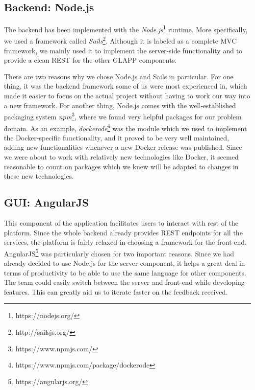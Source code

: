 \documentclass{seal_thesis}
\begin{document}
\subsection{Backend: Node.js}
The backend has been implemented with the \textit{Node.js}\footnote{https://nodejs.org/} runtime.
More specifically, we used a framework called \textit{Sails}\footnote{http://sailsjs.org/}.
Although it is labeled as a complete MVC framework, we mainly used it to implement the server-side functionality and to provide a clean REST for the other GLAPP components.

There are two reasons why we chose Node.js and Sails in particular.
For one thing, it was the backend framework some of us were most experienced in, which made it easier to focus on the actual project without having to work our way into a new framework.
For another thing, Node.js comes with the well-established packaging system \textit{npm}\footnote{https://www.npmjs.com/}, where we found very helpful packages for our problem domain.
As an example, \textit{dockerode}\footnote{https://www.npmjs.com/package/dockerode} was the module which we used to implement the Docker-specific functionality, and it proved to be very well maintained, adding new functionalities whenever a new Docker release was published.
Since we were about to work with relatively new technologies like Docker, it seemed reasonable to count on packages which we knew will be adapted to changes in these new technologies.

\subsection{GUI: AngularJS}


This component of the application facilitates users to interact with rest of the platform. 
Since the whole backend already provides REST endpoints for all the services, the platform is fairly relaxed in choosing a framework for the front-end. 
AngularJS\footnote{https://angularjs.org/} was particularly chosen for two important reasons. 
Since we had already decided to use Node.js for the server component, it helps a great deal in terms of productivity to be able to use the same language for other components. 
The team could easily switch between the server and front-end while developing features. 
This can greatly aid us to iterate faster on the feedback received. 
\end{document}
